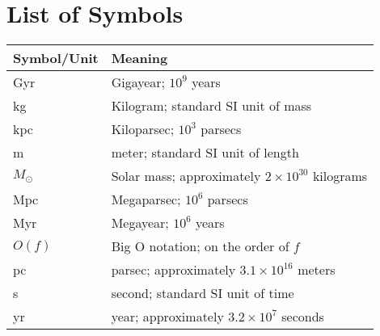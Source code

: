\chapter*{List of Symbols}
\begin{longtable}{ll} 
\hline
Symbol/Unit & Meaning\\ \hline
Gyr & Gigayear; $10^9$ years\\
kg  & Kilogram; standard SI unit of mass\\
kpc & Kiloparsec; $10^3$ parsecs\\
m   & meter; standard SI unit of length\\
$M_\odot$ & Solar mass; approximately $2 \times 10^{30}$ kilograms\\
Mpc & Megaparsec; $10^6$ parsecs\\
Myr & Megayear; $10^6$ years\\
$O(f)$ & Big O notation; on the order of $f$ \\
pc  & parsec; approximately $3.1 \times 10^{16}$ meters\\
s   & second; standard SI unit of time\\
yr  & year; approximately $3.2 \times 10^7$ seconds\\ \hline
\end{longtable}





%







%

%
%

